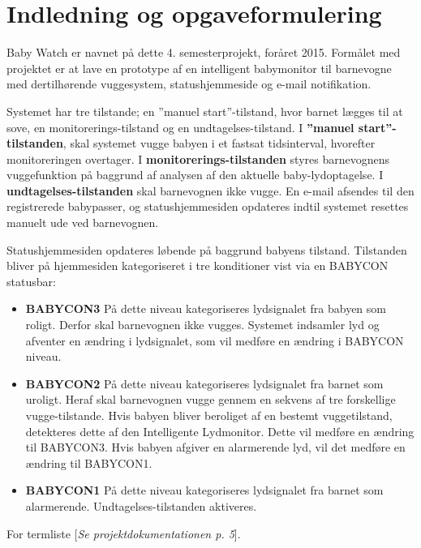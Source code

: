 \chapter{Indledning og opgaveformulering}

Baby Watch er navnet på dette 4. semesterprojekt, foråret 2015. Formålet med projektet er at lave en prototype af en intelligent babymonitor til barnevogne med dertilhørende vuggesystem, statushjemmeside og e-mail notifikation.

Systemet har tre tilstande; en ''manuel start''-tilstand, hvor barnet lægges til at sove, en monitorerings-tilstand og en undtagelses-tilstand.
I \textbf{''manuel start''-tilstanden}, skal systemet vugge babyen i et fastsat tidsinterval, hvorefter monitoreringen overtager.
I \textbf{monitorerings-tilstanden} styres barnevognens vuggefunktion på baggrund af analysen af den aktuelle baby-lydoptagelse.
I \textbf{undtagelses-tilstanden} skal barnevognen ikke vugge. En e-mail afsendes til den registrerede babypasser, og statushjemmesiden opdateres indtil systemet resettes manuelt ude ved barnevognen. 

Statushjemmesiden opdateres løbende  på baggrund babyens tilstand. Tilstanden bliver på hjemmesiden kategoriseret i tre konditioner vist via en BABYCON statusbar:
\vspace{1cm}
\label{kravspec:indledning_babycon_states}
\begin{itemize}
\item \textbf{BABYCON3} 
\newline På dette niveau kategoriseres lydsignalet fra babyen som roligt. Derfor skal barnevognen ikke vugges. Systemet indsamler lyd og afventer en ændring i lydsignalet, som vil medføre en ændring i BABYCON niveau. 

\item \textbf{BABYCON2}
\newline På dette niveau kategoriseres lydsignalet fra barnet som uroligt. Heraf skal barnevognen vugge gennem en sekvens af tre forskellige vugge-tilstande. Hvis babyen bliver beroliget af en bestemt vuggetilstand, detekteres dette af den Intelligente Lydmonitor. Dette vil medføre en ændring til BABYCON3. Hvis babyen afgiver en alarmerende lyd, vil det medføre en ændring til BABYCON1.  

\item \textbf{BABYCON1}
\newline På dette niveau kategoriseres lydsignalet fra barnet som alarmerende. Undtagelses-tilstanden aktiveres. 
\end{itemize}
\vspace{1cm}
For termliste [\textit{Se projektdokumentationen p. 5}].